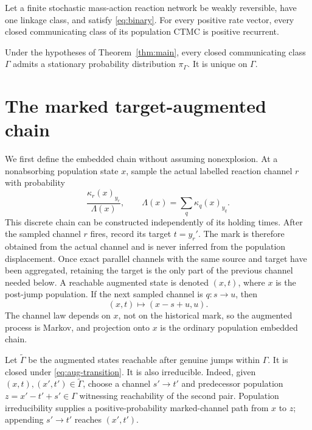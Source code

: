 \begin{theorem}\label{thm:main}
Let a finite stochastic mass-action reaction network be weakly reversible,
have one linkage class, and satisfy \eqref{eq:binary}.  For every positive
rate vector, every closed communicating class of its population CTMC is
positive recurrent.
\end{theorem}

\begin{corollary}\label{cor:stationary}
Under the hypotheses of Theorem~\ref{thm:main}, every closed communicating
class \(\Gamma\) admits a stationary probability distribution
\(\pi_\Gamma\).  It is unique on \(\Gamma\).
\end{corollary}

\section{The marked target-augmented chain}\label{sec:marked}

We first define the embedded chain without assuming nonexplosion.  At a
nonabsorbing population state \(x\), sample the actual labelled reaction
channel \(r\) with probability
\begin{equation}\label{eq:channel-kernel}
  \frac{\kappa_r(x)_{y_r}}{\Lambda(x)},
  \qquad
  \Lambda(x)=\sum_q\kappa_q(x)_{y_q}.
\end{equation}
This discrete chain can be constructed independently of its holding times.
After the sampled channel \(r\) fires, record its target \(t=y_r'\).  The mark
is therefore obtained from the actual channel and is never inferred from the
population displacement.  Once exact parallel channels with the same source
and target have been aggregated, retaining the target is the only part of the
previous channel needed below.  A reachable augmented state is denoted
\((x,t)\), where \(x\) is the post-jump population.  If the next sampled
channel is \(q:s\to u\), then
\begin{equation}\label{eq:aug-transition}
  (x,t)\longmapsto(x-s+u,u).
\end{equation}
The channel law depends on \(x\), not on the historical mark, so the augmented
process is Markov, and projection onto \(x\) is the ordinary population
embedded chain.

Let \(\widetilde\Gamma\) be the augmented states reachable after genuine
jumps within \(\Gamma\).  It is closed under \eqref{eq:aug-transition}.  It is
also irreducible.  Indeed, given \((x,t),(x',t')\in\widetilde\Gamma\), choose
a channel \(s'\to t'\) and predecessor population
\(z=x'-t'+s'\in\Gamma\) witnessing reachability of the second pair.
Population irreducibility supplies a positive-probability marked-channel path
from \(x\) to \(z\); appending \(s'\to t'\) reaches \((x',t')\).

